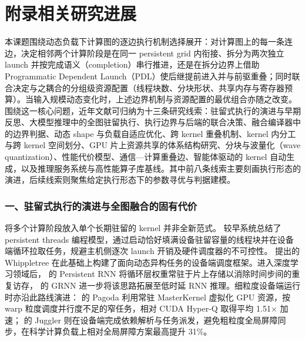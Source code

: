 \section*{附录\quad 相关研究进展}

本课题围绕动态负载下计算图的逐边执行机制选择展开：对计算图上的每一条连边，决定相邻两个计算阶段是在同一 persistent grid 内衔接、拆分为两次独立 launch 并按完成语义（completion）串行推进，还是在拆分边界上借助 Programmatic Dependent Launch（PDL）使后继提前进入并与前驱重叠；同时联合决定与之耦合的分组级资源配置（线程块数、分块形状、共享内存与寄存器预算）。当输入规模动态变化时，上述边界机制与资源配置的最优组合亦随之改变。围绕这一核心问题，近年文献可归纳为十三条研究线索：驻留式执行的演进与早期反思、大模型推理中的全图驻留执行、执行边界与后端的联合决策、融合编译器中的边界判据、动态 shape 与负载自适应优化、跨 kernel 重叠机制、kernel 内分工与跨 kernel 空间划分、GPU 片上资源共享的体系结构研究、分块与波量化（wave quantization）、性能代价模型、通信—计算重叠边、智能体驱动的 kernel 自动生成，以及推理服务系统与高性能算子库基线。其中前八条线索主要刻画执行形态的演进，后续线索则聚焦给定执行形态下的参数寻优与判据建模。

\subsubsection*{一、驻留式执行的演进与全图融合的固有代价}

将多个计算阶段放入单个长期驻留的 kernel 并非全新范式。 较早系统总结了 persistent threads 编程模型，通过启动恰好填满设备驻留容量的线程块并在设备端循环拉取任务，规避主机侧逐次 launch 开销及硬件调度器的不可控性。 提出的 Whippletree 在此基础上构建了面向动态异构任务的设备端调度框架。进入深度学习领域后， 的 Persistent RNN 将循环层权重常驻于片上存储以消除时间步间的重复访存， 的 GRNN 进一步将该思路拓展至低时延 RNN 推理。细粒度设备端运行时亦沿此路线演进： 的 Pagoda 利用常驻 MasterKernel 虚拟化 GPU 资源，按 warp 粒度调度并行度不足的窄任务，相对 CUDA Hyper-Q 取得平均 1.51$\times$ 加速； 的 Juggler 则在设备端完成依赖解析与任务派发，避免粗粒度全局屏障同步，在科学计算负载上相对全局屏障方案最高提升 31\%。

